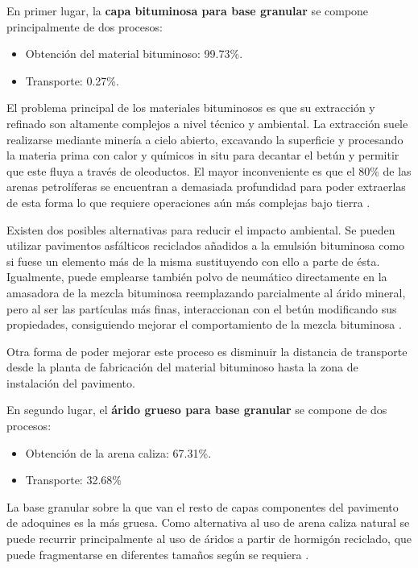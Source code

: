 En primer lugar, la \textbf{capa bituminosa para base granular} se compone principalmente de dos procesos:
\begin{itemize}
  \item Obtención del material bituminoso: 99.73\%.
  \item Transporte: 0.27\%.
\end{itemize}

El problema principal de los materiales bituminosos es que su extracción y refinado son altamente complejos a nivel técnico y ambiental. La extracción suele realizarse mediante minería a cielo abierto, excavando la superficie y procesando la materia prima con calor y químicos in situ para decantar el betún y permitir que este fluya a través de oleoductos. El mayor inconveniente es que el 80\% de las arenas petrolíferas se encuentran a demasiada profundidad para poder extraerlas de esta forma lo que requiere operaciones aún más complejas bajo tierra \cite{eurobitume}.

Existen dos posibles alternativas para reducir el impacto ambiental. Se pueden utilizar pavimentos asfálticos reciclados añadidos a la emulsión bituminosa como si fuese un elemento más de la misma sustituyendo con ello a parte de ésta. Igualmente, puede emplearse también polvo de neumático directamente en la amasadora de la mezcla bituminosa reemplazando parcialmente al árido mineral, pero al ser las partículas más finas, interaccionan con el betún modificando sus propiedades, consiguiendo mejorar el comportamiento de la mezcla bituminosa \cite{polvocaucho}.

Otra forma de poder mejorar este proceso es disminuir la distancia de transporte desde la planta de fabricación del material bituminoso hasta la zona de instalación del pavimento.

En segundo lugar, el \textbf{árido grueso para base granular} se compone de dos procesos:
\begin{itemize}
  \item Obtención de la arena caliza: 67.31\%.
  \item Transporte: 32.68\%
\end{itemize}

La base granular sobre la que van el resto de capas componentes del pavimento de adoquines es la más gruesa. Como alternativa al uso de arena caliza natural se puede recurrir principalmente al uso de áridos a partir de hormigón reciclado, que puede fragmentarse en diferentes tamaños según se requiera \cite{monografia}.

